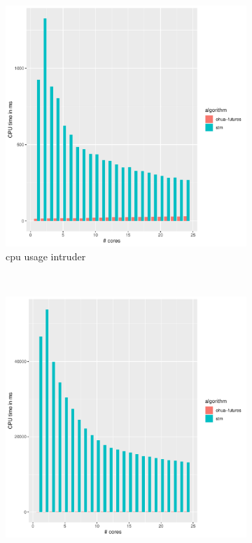 \begin{figure}
    \begin{subfigure}[t]{.32\textwidth}
        \includegraphics[width=\textwidth,keepaspectratio]{gfx/results/intruder/intruder_cpu}
        \caption{cpu usage intruder}%
    \end{subfigure}%
    ~
    \begin{subfigure}[t]{.32\textwidth}
        \includegraphics[width=\textwidth,keepaspectratio]{gfx/results/intruder/intruder+_cpu}

\end{subfigure}
\end{figure}
